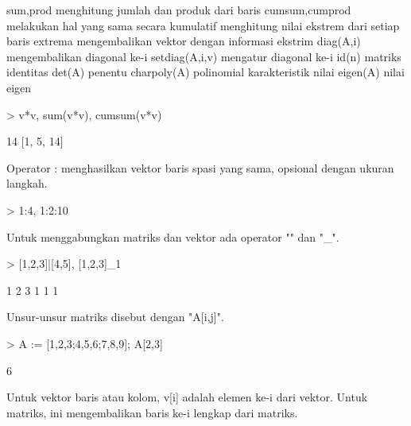 \documentclass[a4paper,10pt]{article}
\begin{document}
\begin{eulernotebook}
\begin{eulercomment}
\begin{eulercomment}
\begin{eulercomment}
\begin{eulercomment}
\begin{eulercomment}
\begin{eulercomment}
\begin{eulercomment}
\end{eulercomment}
\begin{eulerttcomment}
  sum,prod menghitung jumlah dan produk dari baris
  cumsum,cumprod melakukan hal yang sama secara kumulatif
  menghitung nilai ekstrem dari setiap baris
  extrema mengembalikan vektor dengan informasi ekstrim
  diag(A,i) mengembalikan diagonal ke-i
  setdiag(A,i,v) mengatur diagonal ke-i
  id(n) matriks identitas
  det(A) penentu
  charpoly(A) polinomial karakteristik
  nilai eigen(A) nilai eigen
\end{eulerttcomment}
\begin{eulerprompt}
> v*v, sum(v*v), cumsum(v*v)
\end{eulerprompt}
\begin{euleroutput}
  [1,  4,  9]
  14
  [1,  5,  14]
\end{euleroutput}
\begin{eulercomment}
Operator : menghasilkan vektor baris spasi yang sama, opsional dengan
ukuran langkah.
\end{eulercomment}
\begin{eulerprompt}
> 1:4, 1:2:10
\end{eulerprompt}
\begin{euleroutput}
  [1,  2,  3,  4]
  [1,  3,  5,  7,  9]
\end{euleroutput}
\begin{eulercomment}
Untuk menggabungkan matriks dan vektor ada operator "\textbar{}" dan "\_".
\end{eulercomment}
\begin{eulerprompt}
> [1,2,3]|[4,5], [1,2,3]_1
\end{eulerprompt}
\begin{euleroutput}
  [1,  2,  3,  4,  5]
              1             2             3 
              1             1             1 
\end{euleroutput}
\begin{eulercomment}
Unsur-unsur matriks disebut dengan "A[i,j]".
\end{eulercomment}
\begin{eulerprompt}
> A := [1,2,3;4,5,6;7,8,9]; A[2,3]
\end{eulerprompt}
\begin{euleroutput}
  6
\end{euleroutput}
\begin{eulercomment}
Untuk vektor baris atau kolom, v[i] adalah elemen ke-i dari vektor.
Untuk matriks, ini mengembalikan baris ke-i lengkap dari matriks.
\end{eulercomment}

\end{eulercomment}
\end{eulercomment}
\end{eulercomment}
\end{eulercomment}
\end{eulercomment}
\end{eulercomment}
\end{eulernotebook}
\end{document}
